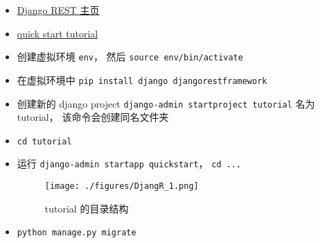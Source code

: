 
\begin{itemize}
\item \href{https://www.django-rest-framework.org/}{Django REST 主页}
\item \href{https://www.django-rest-framework.org/tutorial/quickstart/}{quick start tutorial}
\item 创建虚拟环境 \verb|env|， 然后 \verb|source env/bin/activate|
\item 在虚拟环境中 \verb|pip install django djangorestframework|
\item 创建新的 django project \verb|django-admin startproject tutorial| 名为 tutorial， 该命令会创建同名文件夹
\item \verb|cd tutorial|
\item 运行 \verb|django-admin startapp quickstart|， \verb|cd ..|．
\begin{figure}[ht]
\centering
\texttt{[image: ./figures/DjangR\_1.png]}
\caption{tutorial 的目录结构} \label{DjangR_fig1}
\end{figure}
\item \verb|python manage.py migrate|
\end{itemize}
